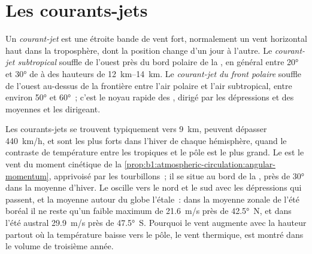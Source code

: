 \section{Les courants-jets}\label{sec:b1:atmospheric-circulation:jets}

\begin{definition}\label{def:b1:atmospheric-circulation:jet}
Un \emph{courant-jet} est une étroite bande de vent fort, normalement un
vent horizontal haut dans la troposphère, dont la position change d'un jour à l'autre. Le
\emph{courant-jet subtropical} souffle de l'ouest près du bord
polaire de la , en général entre \ang{20} et \ang{30} de  à des hauteurs
de \qtyrange{12}{14}{km}. Le \emph{courant-jet du front polaire} souffle
de l'ouest au-dessus de la frontière entre l'air polaire et l'air subtropical, entre environ
\ang{50} et \ang{60}~; c'est le noyau rapide des , dirigé par les
dépressions et  des moyennes  et les dirigeant.
\end{definition}

Les courants-jets se trouvent typiquement vers \qty{9}{km}, peuvent dépasser
\qty{440}{km/h}, et sont les plus forts dans l'hiver de chaque hémisphère, quand le contraste
de température entre les tropiques et le pôle est le plus grand. Le  est
le vent du moment cinétique de la \cref{prop:b1:atmospheric-circulation:angular-momentum},
apprivoisé par les tourbillons~; il se situe au bord de la , près de \ang{30} dans la
moyenne d'hiver. Le  oscille vers le nord et le sud avec les
dépressions qui passent, et la moyenne autour du globe l'étale~: dans la moyenne zonale de
l'été boréal il ne reste qu'un faible maximum de \qty{21.6}{m/s} près de \ang{42.5}~N,
et dans l'été austral \qty{29.9}{m/s} près de \ang{47.5}~S. Pourquoi le vent augmente
avec la hauteur partout où la température baisse vers le pôle, le vent thermique, est
montré dans le volume de troisième année.

